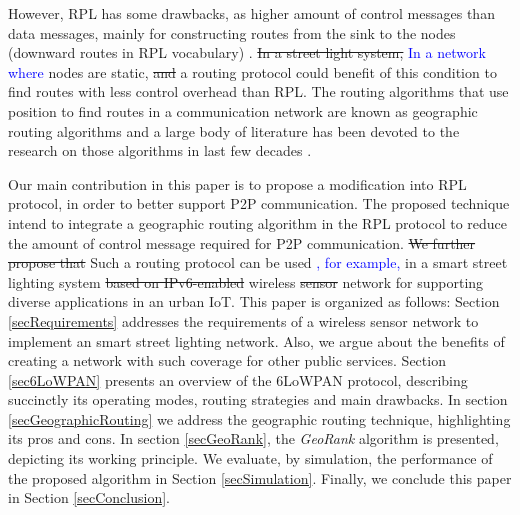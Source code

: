 \documentclass[final,authoryear,3p,twocolumn]{elsarticle}
\newcommand{\rev}{\textcolor{blue}}
\begin{document}
However, RPL has some drawbacks, as higher amount of control messages than data messages, mainly for constructing routes from the sink to the nodes (downward routes in RPL vocabulary) \citep{Heurtefeux_RPL_2013,P2P_analysis_2010,P2P-RPL_2011}. \sout{In a street light system,} \rev{In a network where} nodes are static, \sout{and} a routing protocol could benefit of this condition to find routes with less control overhead than RPL. The routing algorithms that use position to find routes in a communication network are known as geographic routing algorithms and a large body of literature has been devoted to the research on those algorithms in last few decades \citep{Karp_GPSR_2000, Position_Based_Routing_Ad_Hoc_2001, On_Optimal_Geographic_Routing_2007, Denardin2011}.

Our main contribution in this paper is to propose a modification into RPL protocol, in order to better support P2P communication. The proposed technique intend to integrate a geographic routing algorithm in the RPL protocol to reduce the amount of control message required for P2P communication. \sout{We further propose that} Such a routing protocol can be used \rev{, for example,} in a smart street lighting system \sout{based on IPv6-enabled} wireless \sout{sensor} network for supporting diverse applications in an urban IoT. This paper is organized as follows: Section \ref{secRequirements} addresses the requirements of a wireless sensor network to implement an smart street lighting network. Also, we argue about the benefits of creating a network with such coverage for other public services. Section \ref{sec6LoWPAN} presents an overview of the 6LoWPAN protocol, describing succinctly its operating modes, routing strategies and main drawbacks. In section \ref{secGeographicRouting} we address the geographic routing technique, highlighting its pros and cons. In section \ref{secGeoRank}, the \textit{GeoRank} algorithm is presented, depicting its working principle. We evaluate, by simulation, the performance of the proposed algorithm in Section \ref{secSimulation}. Finally, we conclude this paper in Section \ref{secConclusion}.
\end{document}
